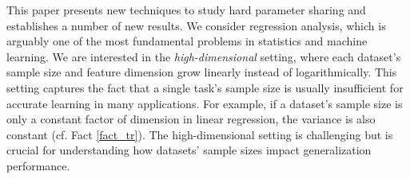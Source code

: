 This paper presents new techniques to study hard parameter sharing and establishes a number of new results.
We consider regression analysis, which is arguably one of the most fundamental problems in statistics and machine learning.
We are interested in the \textit{high-dimensional} setting, where each dataset's sample size and feature dimension grow linearly instead of logarithmically.
This setting captures the fact that a single task's sample size is usually insufficient for accurate learning in many applications.
For example, if a dataset's sample size is only a constant factor of dimension in linear regression, the variance is also constant (cf. Fact \ref{fact_tr}).
The high-dimensional setting is challenging but is crucial for understanding how datasets' sample sizes impact generalization performance.
